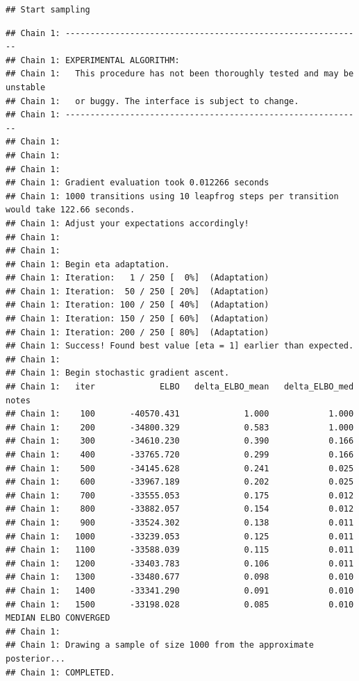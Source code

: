 \documentclass[
]{article}
\begin{document}
\begin{verbatim}
## Start sampling
\end{verbatim}

\begin{verbatim}
## Chain 1: ------------------------------------------------------------
## Chain 1: EXPERIMENTAL ALGORITHM:
## Chain 1:   This procedure has not been thoroughly tested and may be unstable
## Chain 1:   or buggy. The interface is subject to change.
## Chain 1: ------------------------------------------------------------
## Chain 1: 
## Chain 1: 
## Chain 1: 
## Chain 1: Gradient evaluation took 0.012266 seconds
## Chain 1: 1000 transitions using 10 leapfrog steps per transition would take 122.66 seconds.
## Chain 1: Adjust your expectations accordingly!
## Chain 1: 
## Chain 1: 
## Chain 1: Begin eta adaptation.
## Chain 1: Iteration:   1 / 250 [  0%]  (Adaptation)
## Chain 1: Iteration:  50 / 250 [ 20%]  (Adaptation)
## Chain 1: Iteration: 100 / 250 [ 40%]  (Adaptation)
## Chain 1: Iteration: 150 / 250 [ 60%]  (Adaptation)
## Chain 1: Iteration: 200 / 250 [ 80%]  (Adaptation)
## Chain 1: Success! Found best value [eta = 1] earlier than expected.
## Chain 1: 
## Chain 1: Begin stochastic gradient ascent.
## Chain 1:   iter             ELBO   delta_ELBO_mean   delta_ELBO_med   notes 
## Chain 1:    100       -40570.431             1.000            1.000
## Chain 1:    200       -34800.329             0.583            1.000
## Chain 1:    300       -34610.230             0.390            0.166
## Chain 1:    400       -33765.720             0.299            0.166
## Chain 1:    500       -34145.628             0.241            0.025
## Chain 1:    600       -33967.189             0.202            0.025
## Chain 1:    700       -33555.053             0.175            0.012
## Chain 1:    800       -33882.057             0.154            0.012
## Chain 1:    900       -33524.302             0.138            0.011
## Chain 1:   1000       -33239.053             0.125            0.011
## Chain 1:   1100       -33588.039             0.115            0.011
## Chain 1:   1200       -33403.783             0.106            0.011
## Chain 1:   1300       -33480.677             0.098            0.010
## Chain 1:   1400       -33341.290             0.091            0.010
## Chain 1:   1500       -33198.028             0.085            0.010   MEDIAN ELBO CONVERGED
## Chain 1: 
## Chain 1: Drawing a sample of size 1000 from the approximate posterior... 
## Chain 1: COMPLETED.
\end{verbatim}
\end{document}
